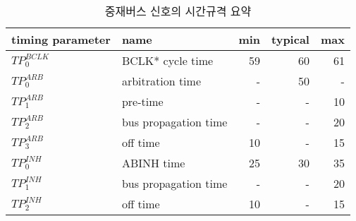 %
%
\begin{table}[htbp]
\caption{중재버스 신호의 시간규격 요약}\label{table:arb-time}
   \begin{center}
   \begin{tabular}{|l|l|r|r|r|} \hline
	timing parameter & name & min & typical & max \\ \hline \hline
	$TP^{BCLK}_0$ & BCLK* cycle time & 59 & 60 & 61 \\ \hline
	$TP^{ARB}_0$  & arbitration time & - & 50 & - \\ \hline
	$TP^{ARB}_1$  & pre-time & - & - & 10 \\ \hline
	$TP^{ARB}_2$  & bus propagation time & - & - & 20 \\ \hline
	$TP^{ARB}_3$  & off time & 10 & - & 15 \\ \hline \hline
	$TP^{INH}_0$  & ABINH time & 25 & 30 & 35 \\ \hline
	$TP^{INH}_1$  & bus propagation time & - & - & 20 \\ \hline
	$TP^{INH}_2$  & off time & 10 & - & 15 \\ \hline
   \end{tabular}
   \end{center}
\end{table}
%
%
